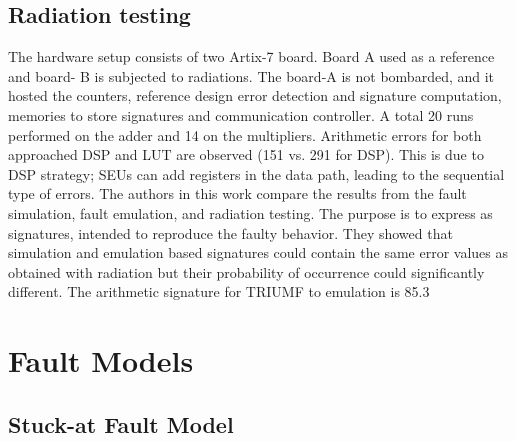 \subsection{Radiation testing}
The hardware setup consists of two Artix-7 board. Board A used as a reference and board- B is subjected to radiations. The board-A is not bombarded, and it hosted the counters, reference design error detection and signature computation, memories to store signatures and communication controller. A total 20 runs performed on the adder and 14 on the multipliers. Arithmetic errors for both approached DSP and LUT are observed (151 vs. 291 for DSP). This is due to DSP strategy; SEUs can add registers in the data path, leading to the sequential type of errors. The authors in this work compare the results from the fault simulation, fault emulation, and radiation testing. The purpose is to express as signatures, intended to reproduce the faulty behavior. They showed that simulation and emulation based signatures could contain the same error values as obtained with radiation but their probability of occurrence could significantly different. The arithmetic signature for TRIUMF to emulation is 85.3 %





\section{Fault Models}


\subsection{Stuck-at Fault Model}

